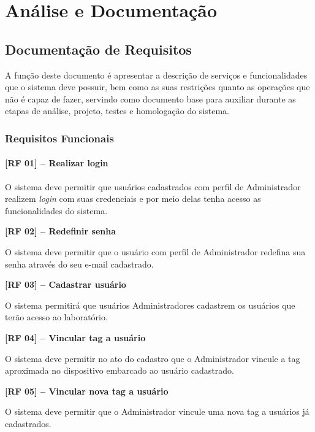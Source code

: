 \chapter{Análise e Documentação}
\label{Analise e Documentacao}



\section{Documentação de Requisitos}

A função deste documento é apresentar a descrição de serviços e funcionalidades que o sistema deve possuir, bem como as suas restrições quanto as operações que não é capaz de fazer, servindo como documento base para auxiliar durante as etapas de análise, projeto, testes e homologação do sistema.

    
\subsection{Requisitos Funcionais}
\label{Requisitos Funcionais}
 
 
    \noindent
    \subsubsection{[RF 01] – Realizar login}
    
        O sistema deve permitir que usuários cadastrados com perfil de Administrador realizem \textit{login} com suas credenciais e por meio delas tenha acesso as funcionalidades do sistema.
    
    \noindent
    \textbf{[RF 02] – Redefinir senha}
    
        O sistema deve permitir que o usuário com perfil de Administrador redefina sua senha através do seu e-mail cadastrado. 
    
    \noindent
    \textbf{[RF 03] – Cadastrar usuário}
    
        O sistema permitirá que usuários Administradores cadastrem os usuários que terão acesso ao laboratório. 
    
    \noindent
    \textbf{[RF 04] – Vincular tag a usuário}
    
        O sistema deve permitir no ato do cadastro que o Administrador vincule a tag aproximada no dispositivo embarcado ao usuário cadastrado.
    
    \noindent
    \textbf{[RF 05] – Vincular nova tag a usuário}
    
        O sistema deve permitir que o Administrador vincule uma nova tag a usuários já cadastrados.
        
